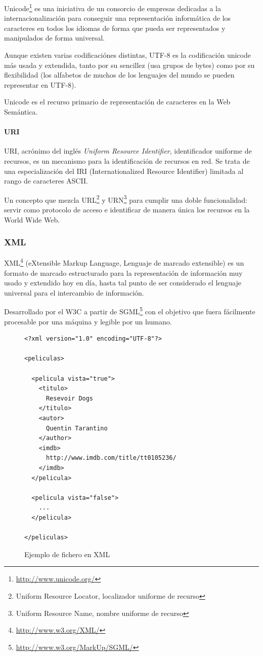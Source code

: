 Unicode\footnote{\url{http://www.unicode.org/}} es una iniciativa de un consorcio de 
empresas dedicadas a la internacionalización para conseguir una representación 
informática de los caracteres en todos los idiomas de forma que pueda ser representados
y manipulados de forma universal. 

Aunque existen varias codificaciónes distintas, UTF-8\cite{Yergeau2003} es la 
codificación unicode más usada y extendida, tanto por su sencillez (usa grupos 
de bytes) como por su flexibilidad (los alfabetos de muchos de los lenguajes 
del mundo se pueden representar en UTF-8).

Unicode es el recurso primario de representación de caracteres en la Web Semántica.

\paragraph{URI}

URI\cite{Berners-Lee1998}, acrónimo del inglés \emph{Uniform Resource Identifier}, 
identificador uniforme de recursos, es un mecanismo para la identificación de recursos
en red. Se trata de una especialización del IRI (Internationalized Resource Identifier) 
limitada al rango de caracteres ASCII.

Un concepto que mezcla URL\footnote{Uniform Resource Locator, localizador uniforme de recurso} 
y URN\footnote{Uniform Resource Name, nombre uniforme de recurso} para cumplir una doble 
funcionalidad: servir como protocolo de acceso e identificar de manera única los recursos 
en la World Wide Web.

\subsubsection{XML}

XML\footnote{\url{http://www.w3.org/XML/}} (eXtensible Markup Language, Lenguaje 
de marcado extensible) es un formato de marcado estructurado para la representación 
de información muy usado y extendido hoy en día, hasta tal punto de ser considerado 
el lenguaje universal para el intercambio de información. 

Desarrollado por el W3C a partir de SGML\footnote{\url{http://www.w3.org/MarkUp/SGML/}} 
con el objetivo que fuera fácilmente procesable por una máquina y legible por un 
humano. 

\begin{figure}[H]
\lstset{language=XML}
\begin{lstlisting}
<?xml version="1.0" encoding="UTF-8"?>

<peliculas>

  <pelicula vista="true">
    <titulo>
      Resevoir Dogs
    </titulo>
    <autor>
      Quentin Tarantino
    </author>
    <imdb>
      http://www.imdb.com/title/tt0105236/
    </imdb>
  </pelicula>

  <pelicula vista="false">
    ...
  </pelicula>

</peliculas>
\end{lstlisting}
\caption{Ejemplo de fichero en XML}
\label{fig:ejemplo.xml}
\end{figure}

